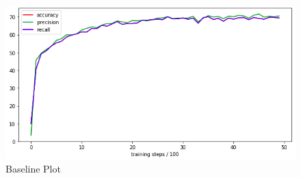 \documentclass[12pt]{report}
\begin{document}
\vspace{0.5cm}
\begin{figure}[ht!]
	\centering
	\includegraphics[width=12cm]{baseline-graph}
	\caption{Baseline Plot}
	\label{fig:baseline}
\end{figure}
\end{document}
